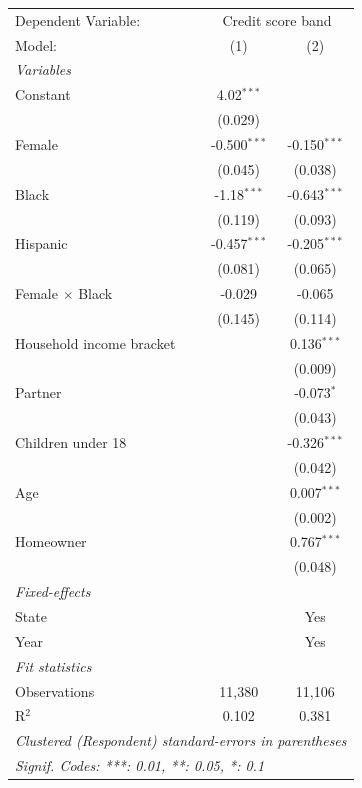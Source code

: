 
\begingroup
\centering
\begin{tabular}{lcc}
   \tabularnewline \midrule \midrule
   Dependent Variable: & \multicolumn{2}{c}{Credit score band}\\
   Model:                   & (1)            & (2)\\  
   \midrule
   \emph{Variables}\\
   Constant                 & 4.02$^{***}$   &   \\   
                            & (0.029)        &   \\   
   Female                   & -0.500$^{***}$ & -0.150$^{***}$\\   
                            & (0.045)        & (0.038)\\   
   Black                    & -1.18$^{***}$  & -0.643$^{***}$\\   
                            & (0.119)        & (0.093)\\   
   Hispanic                 & -0.457$^{***}$ & -0.205$^{***}$\\   
                            & (0.081)        & (0.065)\\   
   Female $\times$ Black    & -0.029         & -0.065\\   
                            & (0.145)        & (0.114)\\   
   Household income bracket &                & 0.136$^{***}$\\   
                            &                & (0.009)\\   
   Partner                  &                & -0.073$^{*}$\\   
                            &                & (0.043)\\   
   Children under 18        &                & -0.326$^{***}$\\   
                            &                & (0.042)\\   
   Age                      &                & 0.007$^{***}$\\   
                            &                & (0.002)\\   
   Homeowner                &                & 0.767$^{***}$\\   
                            &                & (0.048)\\   
   \midrule
   \emph{Fixed-effects}\\
   State                    &                & Yes\\  
   Year                     &                & Yes\\  
   \midrule
   \emph{Fit statistics}\\
   Observations             & 11,380         & 11,106\\  
   R$^2$                    & 0.102          & 0.381\\  
   \midrule \midrule
   \multicolumn{3}{l}{\emph{Clustered (Respondent) standard-errors in parentheses}}\\
   \multicolumn{3}{l}{\emph{Signif. Codes: ***: 0.01, **: 0.05, *: 0.1}}\\
\end{tabular}
\par\endgroup


